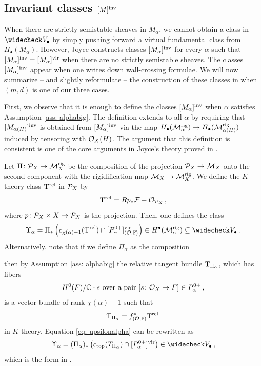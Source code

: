 \documentclass[a4paper, 12pt]{amsart}
\begin{document}
\subsection{Invariant classes $[M]^{\mathrm{inv}}$}
\label{sec: joyceclasses}
When there are strictly semistable sheaves in $M_\alpha$, we cannot obtain a class in $\widecheck V_\bullet$ by simply pushing forward a virtual fundamental class from $H_\bullet(M_\alpha)$. However, Joyce constructs classes $[M_\alpha]^{\mathrm{inv}}$ for every $\alpha$ such that $[M_\alpha]^{\mathrm{inv}}=[M_\alpha]^{\mathrm{vir}}$ when there are no strictly semistable sheaves. The classes $[M_\alpha]^{\mathrm{inv}}$ appear when one writes down wall-crossing formulae. We will now summarize -- and slightly reformulate -- the construction of these classes in \cite[Theorem 5.7, Section 9]{Jo21} when $(m,d)$ is one of our three cases. 


First, we observe that it is enough to define the classes $[M_\alpha]^{\mathrm{inv}}$ when $\alpha$ satisfies Assumption \ref{ass: alphabig}. The definition extends to all $\alpha$ by requiring that $[M_{\alpha(H)}]^{\mathrm{inv}}$ is obtained from $[M_{\alpha}]^{\mathrm{inv}}$ via the map $H_\bullet({\mathcal M}_\alpha^{\mathrm{rig}})\to H_\bullet({\mathcal M}_{\alpha(H)}^{\mathrm{rig}})$ induced by tensoring with ${\mathcal O}_X(H)$. The argument that this definition is consistent is one of the core arguments in Joyce's theory proved in \cite[Proposition 9.12]{Jo21}. 

Let $\Pi\colon {\mathcal P}_X\to {\mathcal M}_X^{\mathrm{rig}}$ be the composition of the projection ${\mathcal P}_X\to {\mathcal M}_X$ onto the second component with the rigidification map ${\mathcal M}_X\to {\mathcal M}_X^{\mathrm{rig}}$. We define the $K$-theory class $\mathrm{T}^{\rm rel}$ in ${\mathcal P}_X$ by
\[\mathrm{T}^{\rm rel}=Rp_\ast {\mathcal F}-{\mathcal O}_{{\mathcal P}_X}\,,\]
where $p\colon {\mathcal P}_X\times X\to {\mathcal P}_X$ is the projection. Then, one defines the class
\begin{equation}\label{eq: upsilonalpha}
\Upsilon_\alpha=\Pi_\ast\left( c_{\chi(\alpha)-1}(\T^{\rel})\cap [P_\alpha^{0+}]^\vir_{(\CO,\BF)} \right)\in H^\bullet(\M_\alpha^\rig)\subseteq \widecheck V_\bullet\,.
\end{equation}
Alternatively, note that if we define $\Pi_\alpha$ as the composition
\begin{center} \end{center}
then by Assumption \ref{ass: alphabig} the relative tangent bundle $\mathrm{T}_{\Pi_\alpha}$, which has fibers 
\[H^0(F)/{\mathbb{C}}\cdot s\textup{ over a pair }[s\colon {\mathcal O}_X\to F]\in P_\alpha^{0+}\,,\] is a vector bundle of rank $\chi(\alpha)-1$ such that \[\mathrm{T}_{\Pi_\alpha}=f_{({\mathcal O},{\mathbb{F}})}^\ast \mathrm{T}^{\rm rel}\,\]
in $K$-theory. Equation \eqref{eq: upsilonalpha} can be rewritten as 
\begin{equation}\label{eq: upsilonalpha2}
\Upsilon_\alpha=(\Pi_\alpha)_\ast\left( c_{\tp}(T_{\Pi_\alpha})\cap [P_\alpha^{0+}]^\vir \right)\in \widecheck V_\bullet\,,
\end{equation}
which is the form in \cite[(5.29)]{Jo21}.
\end{document}
